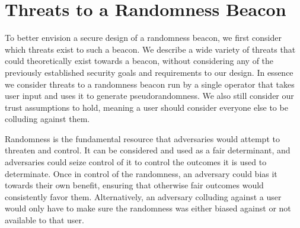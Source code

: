 \section{Threats to a Randomness Beacon}
To better envision a secure design of a randomness beacon, we first consider which threats exist to such a beacon. We describe a wide variety of threats that could theoretically exist towards a beacon, without considering any of the previously established security goals and requirements to our design. In essence we consider threats to a randomness beacon run by a single operator that takes user input and uses it to generate pseudorandomness. We also still consider our trust assumptions to hold, meaning a user should consider everyone else to be colluding against them. 

Randomness is the fundamental resource that adversaries would attempt to threaten and control. It can be considered and used as a fair determinant, and adversaries could seize control of it to control the outcomes it is used to determinate. Once in control of the randomness, an adversary could bias it towards their own benefit, ensuring that otherwise fair outcomes would consistently favor them. Alternatively, an adversary colluding against a user would only have to make sure the randomness was either biased against or not available to that user. 
